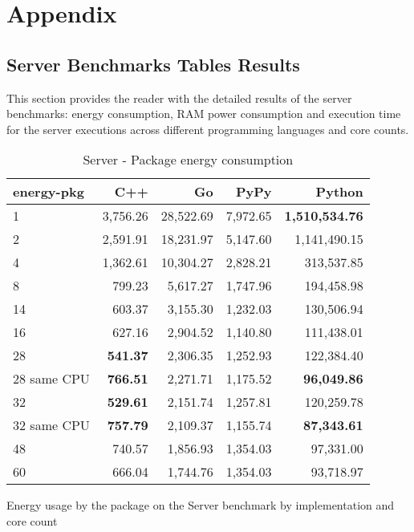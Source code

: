 \chapter{Appendix}\label{chap:appendix}


\section{Server Benchmarks Tables Results}

This section provides the reader with the detailed results of the server benchmarks: energy consumption, RAM power consumption and execution time for the server executions across different programming languages and core counts.

\begin{table}[H]
    \centering
    \begin{tabular}{lrrrr}
        \hline
        energy-pkg     & C++                & Go         & PyPy       & Python        \\
        \hline
        1              & 3,756.26            & 28,522.69   & 7,972.65   & \textbf{1,510,534.76}  \\
        2              & 2,591.91            & 18,231.97   & 5,147.60   & 1,141,490.15           \\
        4              & 1,362.61            & 10,304.27   & 2,828.21   &   313,537.85           \\
        8	           &   799.23 	         & 5,617.27    & 1,747.96   &	194,458.98           \\ 
        14             &   603.37            & 3,155.30    & 1,232.03   &   130,506.94           \\
        16             &   627.16            & 2,904.52    & 1,140.80   &   111,438.01           \\
        28             &   \textbf{541.37}   & 2,306.35    & 1,252.93   &   122,384.40           \\
        28 same CPU    &   \textbf{766.51}   & 2,271.71    & 1,175.52   &   \textbf{96,049.86}   \\
        32             &   \textbf{529.61}   & 2,151.74    & 1,257.81   &   120,259.78           \\
        32 same CPU    &   \textbf{757.79}   & 2,109.37    & 1,155.74   &   \textbf{87,343.61}   \\
        48             &   740.57            & 1,856.93    & 1,354.03   &    97,331.00           \\
        60             &   666.04            & 1,744.76    & 1,354.03   &    93,718.97           \\
        \hline
    \end{tabular}
\caption{Server - Package energy consumption}{Energy usage by the package on the Server benchmark by implementation and core count}
\label{tab:server-energy-pkg}
\end{table}

